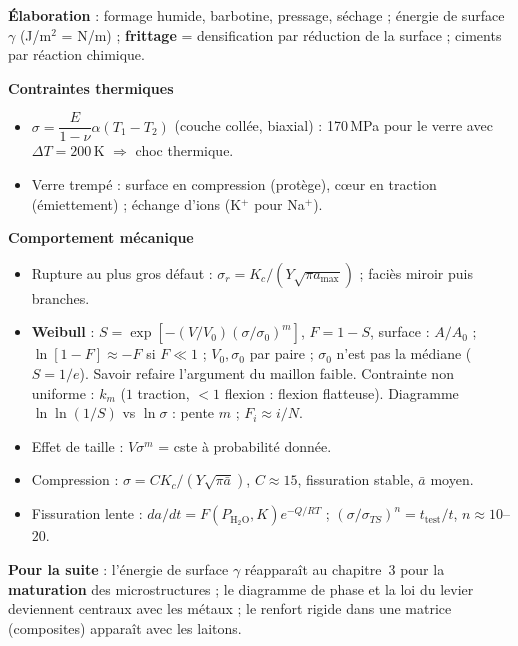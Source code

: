 \begin{recapbox}
\textbf{Élaboration} : formage humide, barbotine, pressage, séchage ; énergie de surface
$\gamma$ (J/m$^2$ = N/m) ; \textbf{frittage} = densification par réduction de la surface ;
ciments par réaction chimique.

\textbf{Contraintes thermiques}
\begin{itemize}
  \item \textbf{$\sigma = \dfrac{E}{1-\nu}\alpha(T_1 - T_2)$} (couche collée, biaxial) :
        170\,MPa pour le verre avec $\Delta T = 200$\,K $\Rightarrow$ choc thermique.
  \item Verre trempé : surface en compression (protège), c\oe ur en traction (émiettement) ;
        échange d'ions (K$^+$ pour Na$^+$).
\end{itemize}

\textbf{Comportement mécanique}
\begin{itemize}
  \item Rupture au plus gros défaut : $\sigma_r = K_c/(Y\sqrt{\pi a_{\max}})$ ; faciès miroir
        puis branches.
  \item \textbf{Weibull} : $S = \exp[-(V/V_0)(\sigma/\sigma_0)^m]$, $F = 1 - S$, surface :
        $A/A_0$ ; $\ln[1-F] \approx -F$ si $F \ll 1$ ; $V_0, \sigma_0$ par paire ;
        $\sigma_0$ n'est pas la médiane ($S = 1/e$). Savoir refaire l'argument du maillon
        faible. Contrainte non uniforme : $k_m$ ($1$ traction, $<1$ flexion : flexion
        flatteuse). Diagramme $\ln\ln(1/S)$ vs $\ln\sigma$ : pente $m$ ; $F_i \approx i/N$.
  \item Effet de taille : $V\sigma^m$ = cste à probabilité donnée.
  \item Compression : $\sigma = C K_c/(Y\sqrt{\pi\bar a})$, $C \approx 15$, fissuration
        stable, $\bar a$ moyen.
  \item Fissuration lente : $da/dt = F(P_{\text{H}_2\text{O}}, K)e^{-Q/RT}$ ;
        $(\sigma/\sigma_{TS})^n = t_{\text{test}}/t$, $n \approx 10$--$20$.
\end{itemize}

\textbf{Pour la suite} : l'énergie de surface $\gamma$ réapparaît au chapitre~3 pour la
\textbf{maturation} des microstructures ; le diagramme de phase et la loi du levier deviennent
centraux avec les métaux ; le \og renfort\fg{} rigide dans une matrice (composites) apparaît
avec les laitons.
\end{recapbox}
